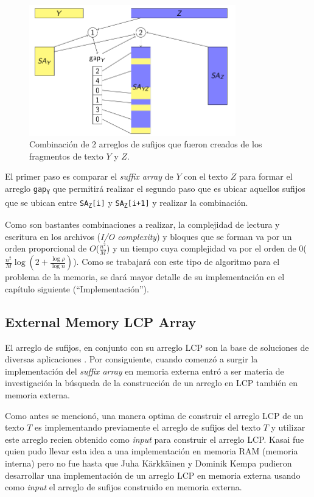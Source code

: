 \newpage

\begin{figure}[h]
    \centering
    \includegraphics[width=0.8\textwidth]{./images/combinacion2bloques.png}
    \caption{Combinación de 2 arreglos de sufijos que fueron creados de los fragmentos de texto $Y$ y $Z$.}
    \label{fig:comb2}
\end{figure}

El primer paso es comparar el \textit{suffix array} de $Y$ con el texto $Z$ para formar el arreglo \texttt{gap\textsubscript{Y}} que permitirá realizar el segundo paso que es ubicar aquellos sufijos que se ubican entre \texttt{SA\textsubscript{Z}[i]} y \texttt{SA\textsubscript{Z}[i+1]} y realizar la combinación.

Como son bastantes combinaciones a realizar, la complejidad de lectura y escritura en los archivos (\textit{I/O complexity}) y bloques que se forman va por un orden proporcional de $O$($\frac{n^{2}}{M}$) y un tiempo cuya complejidad va por el orden de 0($\frac{n^{2}}{M} \log (2 + \frac{\log \rho}{\log n})$). Como se trabajará con este tipo de algoritmo para el problema de la memoria, se dará mayor detalle de su implementación en el capítulo siguiente (``Implementación'').

\subsection{External Memory LCP Array}

El arreglo de sufijos, en conjunto con su arreglo LCP son la base de soluciones de diversas aplicaciones \cite{aplicacion}. Por consiguiente, cuando comenzó a surgir la implementación del \textit{suffix array} en memoria externa entró a ser materia de investigación la búsqueda de la construcción de un arreglo en LCP también en memoria externa.

Como antes se mencionó, una manera optima de construir el arreglo LCP de un texto $T$ es implementando previamente el arreglo de sufijos del texto $T$ y utilizar este arreglo recien obtenido como \textit{input} para construir el arreglo LCP. Kasai \cite{kasai} fue quien pudo llevar esta idea a una implementación en memoria RAM (memoria interna) pero no fue hasta que Juha Kärkkäinen y Dominik Kempa \cite{lcpscan} pudieron desarrollar una implementación de un arreglo LCP en memoria externa usando como \textit{input} el arreglo de sufijos construido en memoria externa.

